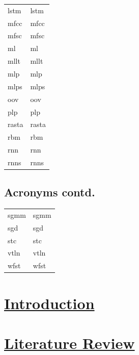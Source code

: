 \documentclass[12pt,twoside]{report}
\begin{document}
\begin{table}[tp]
\begin{tabular}{ll}
\acrshort{lstm} & \acrlong{lstm} \\
\acrshort{mfcc} & \acrlong{mfcc} \\
\acrshort{mfsc} & \acrlong{mfsc} \\
\acrshort{ml} & \acrlong{ml} \\
\acrshort{mllt} & \acrlong{mllt} \\
\acrshort{mlp} & \acrlong{mlp} \\
\acrshort{mlps} & \acrlong{mlps} \\
\acrshort{oov} & \acrlong{oov} \\
\acrshort{plp} & \acrlong{plp} \\
\acrshort{rasta} & \acrlong{rasta} \\
\acrshort{rbm} & \acrlong{rbm} \\
\acrshort{rnn} & \acrlong{rnn} \\
\acrshort{rnns} & \acrlong{rnns} \\
\end{tabular}
\end{table}

\clearpage
\begin{table}[tp]
  \label{tab:acronymns2}
\section*{Acronyms contd.}
\begin{tabular}{ll}
\acrshort{sgmm} & \acrlong{sgmm} \\
\acrshort{sgd} & \acrlong{sgd} \\
\acrshort{stc} & \acrlong{stc} \\
\acrshort{vtln} & \acrlong{vtln} \\
\acrshort{wfst} & \acrlong{wfst} 
\end{tabular}
\end{table}
  
\chapter{\href{https://docs.google.com/document/d/1h8ZEcfEUpjJM6wYkgYYH-ryuiBFYVGSQA-Sf1StQtiY/edit#heading=h.i9tlo6ovvcpr}{Introduction}}\label{ch1_intro}


\chapter{\href{https://docs.google.com/document/d/1h8ZEcfEUpjJM6wYkgYYH-ryuiBFYVGSQA-Sf1StQtiY/edit#heading=h.i9tlo6ovvcpr}{Literature Review}}\label{c02}\label{ch2litrev}

\end{document}
